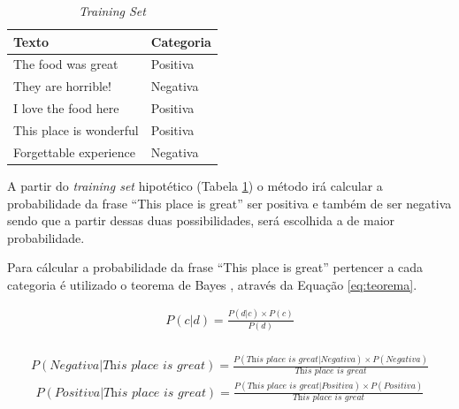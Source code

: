 \begin{table}[htb]
\centering
\begin{tabular}{|l|l|}
\hline
Texto  & Categoria \\ \hline
The food was great  & Positiva     \\ \hline
They are horrible!    & Negativa     \\ \hline
I love the food here  & Positiva     \\ \hline
This place is wonderful  & Positiva     \\ \hline
Forgettable experience  & Negativa     \\ \hline
\end{tabular}
\caption{\textit{Training Set}}
\label{tab:trainingsetnb}
\end{table}

A partir do \textit{training set} hipotético (Tabela
\ref{tab:trainingsetnb}) o método irá calcular a probabilidade da frase ``This
place is great'' ser positiva e também de ser negativa sendo que a partir dessas
duas possibilidades, será escolhida a de maior probabilidade.

Para cálcular a probabilidade da frase ``This place is great'' pertencer a cada categoria
é utilizado o teorema de Bayes \cite{manningschutze1999}, através da Equação
\ref{eq:teorema}.

\begin{equation}
\begin{gathered}
P(c|d) = \frac{P(d|c) \times P(c)}{P(d)} \\
\label{eq:teorema}
\end{gathered}
\end{equation}

\begin{equation}
\begin{gathered}
P(Negativa|\textit{This place is great})
=
\frac{P(\textit{This place is great}|Negativa) \times
P(Negativa)}{\textit{This place is great}}
\label{eq:teoreman1}
\end{gathered}
\end{equation}
\begin{equation}
\begin{gathered}
P(Positiva|\textit{This place is great})
=
\frac{P(\textit{This place is great}|Positiva) \times
P(Positiva)}{\textit{This place is great}}
\label{eq:teoremap1}
\end{gathered}
\end{equation}


